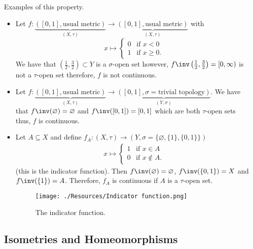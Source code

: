 \documentclass[12pt, a4paper]{article}
\begin{document}
\begin{mdexample}
    Examples of this property.
    \begin{itemize}
        \item Let \(f : \underbrace{([0,1], \text{usual metric})}_{(X,\tau)} \to \underbrace{([0,1], \text{usual metric})}_{(X,\tau)}\) with 
        \[x \mapsto \begin{cases}
            0 &\text{if } x <0 \\
            1 &\text{if } x\geq 0.
        \end{cases}\]
        We have that \(\left(\frac{1}{2},\frac{3}{2}\right) \subset Y\) is a \(\sigma\)-open set however, \(f\inv\left( \frac{1}{2},\frac{3}{2} \right) = [0,\infty)\) is not a \(\tau\)-open set therefore, \(f\) is not continuous.
        \item Let \(f : \underbrace{([0,1], \text{usual metric})}_{(X,\tau)} \to \underbrace{([0,1],\sigma=\text{trivial topology})}_{(Y,\sigma)}\). We have that \(f\inv(\varnothing) = \varnothing\) and \(f\inv([0,1])=[0,1]\) which are both \(\tau\)-open sets thus, \(f\) is continuous.
        \item Let \(A \subseteq X\) and define \(f_A :(X,\tau) \to (Y,\sigma = \{\varnothing, \{1\}, \{0,1\}\})\) 
        \[\begin{aligned}
            x \mapsto \begin{cases}
                1 &\text{if } x \in A \\
                0 &\text{if } x \not\in A.
            \end{cases}
        \end{aligned}\]
        (this is the indicator function). Then \(f\inv(\varnothing)=\varnothing\), \(f\inv(\{0,1\})=X\) and \(f\inv(\{1\})=A\). Therefore, \(f_A\) is continuous if \(A\) is a \(\tau\)-open set. 
        \begin{figure}[H]
             \begin{center}
                 \texttt{[image: ./Resources/Indicator function.png]}
             \end{center}
             \caption{The indicator function.}
        \end{figure}
    \end{itemize}    
\end{mdexample}

\subsection{Isometries and Homeomorphisms}
\end{document}

